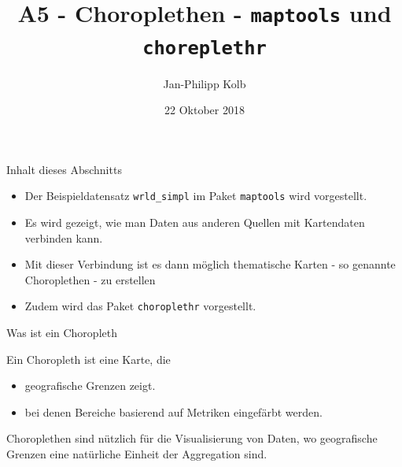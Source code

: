 \documentclass[ignorenonframetext,]{beamer}
\title{A5 - Choroplethen - \texttt{maptools} und \texttt{choreplethr}}
\author{Jan-Philipp Kolb}
\date{22 Oktober 2018}
\providecommand{\tightlist}{%
  \setlength{\itemsep}{0pt}\setlength{\parskip}{0pt}}
\begin{document}
\frame{\titlepage}

\begin{frame}[fragile]{Inhalt dieses Abschnitts}
\protect\hypertarget{inhalt-dieses-abschnitts}{}

\begin{itemize}
\tightlist
\item
  Der Beispieldatensatz \texttt{wrld\_simpl} im Paket \texttt{maptools}
  wird vorgestellt.
\item
  Es wird gezeigt, wie man Daten aus anderen Quellen mit Kartendaten
  verbinden kann.
\item
  Mit dieser Verbindung ist es dann möglich thematische Karten - so
  genannte Choroplethen - zu erstellen
\item
  Zudem wird das Paket \texttt{choroplethr} vorgestellt.
\end{itemize}

\end{frame}

\begin{frame}{Was ist ein Choropleth}
\protect\hypertarget{was-ist-ein-choropleth}{}

\begin{block}{Ein Choropleth ist eine Karte, die}

\begin{itemize}
\tightlist
\item
  geografische Grenzen zeigt.
\item
  bei denen Bereiche basierend auf Metriken eingefärbt werden.
\end{itemize}

Choroplethen sind nützlich für die Visualisierung von Daten, wo
geografische Grenzen eine natürliche Einheit der Aggregation sind.

\end{block}

\end{frame}
\end{document}
